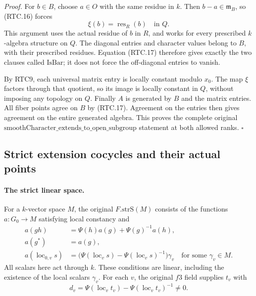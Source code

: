 \emph{Proof.}
For \(b\in B\), choose \(a\in O\) with the same residue in
\(k\).  Then \(b-a\in\mathfrak m_B\), so (RTC.16) forces
\[
 \xi(b)=\operatorname{res}_R(b)\quad\text{in }Q.
                                                        \tag{RTC.17}
\]
This argument uses the actual residue of \(b\) in \(R\), and
works for every prescribed \(k\)-algebra structure on \(Q\).
The diagonal entries and character values belong to \(B\), with
their prescribed residues.  Equation (RTC.17) therefore gives
exactly the two clauses called \(\mathrm{IsBar}\); it does not
force the off-diagonal entries to vanish.

By RTC9, each universal matrix entry is locally constant modulo
\(x_0\).  The map \(\xi\) factors through that quotient,
so its image is locally constant in \(Q\), without imposing
any topology on \(Q\).  Finally \(A\) is generated by \(B\)
and the matrix entries.  All fiber points agree on \(B\) by
(RTC.17).  Agreement on the entries then gives agreement on the
entire generated algebra.  This proves the complete original
\(\mathrm{smoothCharacter\_extends\_to\_open\_subgroup}\)
statement at both allowed ranks. \hfill\(\square\)

\subsection{Strict extension cocycles and their actual points}

\paragraph{The strict linear space.}
For a \(k\)-vector space \(M\), the original
\(F.\mathrm{strS}(M)\) consists of the functions
\(a:G_0\to M\) satisfying local constancy and
\[
 \begin{aligned}
 a(gh)&=\Psi(h)a(g)+\Psi(g)^{-1}a(h),\\
 a(g^*)&=a(g),\\
 a(\operatorname{loc}_{0,v}s)
   &=\bigl(\Psi(\operatorname{loc}_v s)
               -\Psi(\operatorname{loc}_v s)^{-1}\bigr)\gamma_v
       \quad\text{for some }\gamma_v\in M.
 \end{aligned}                                             \tag{RTC.18}
\]
All scalars here act through \(k\).  These conditions are linear,
including the existence of the local scalars \(\gamma_v\).
For each \(v\), the original \(f3\) field supplies \(t_v\)
with
\[
 d_v=\Psi(\operatorname{loc}_v t_v)
             -\Psi(\operatorname{loc}_v t_v)^{-1}\ne0.
                                                        \tag{RTC.19}
\]

